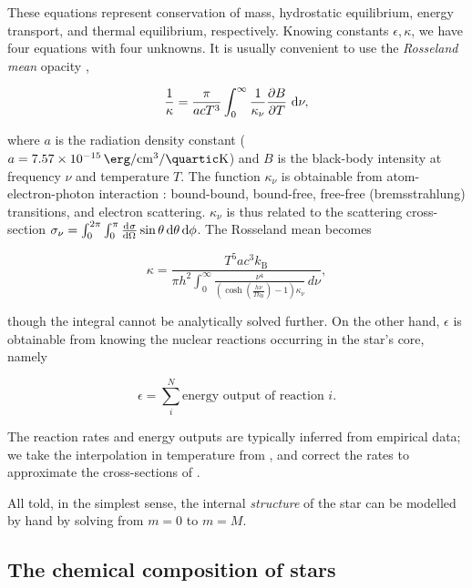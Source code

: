 These equations represent conservation of mass, hydrostatic equilibrium, energy transport, and thermal equilibrium, respectively. Knowing constants $\epsilon, \kappa$, we have four equations with four unknowns. It is usually convenient to use the \textit{Rosseland mean} opacity \citep{Rosseland:1924},

\begin{equation}
    \frac{1}{\kappa} = \frac{\pi}{acT^3}\int_0^\infty \frac{1}{\kappa_\nu}\pdv{B}{T}~\mathrm{d}\nu,
\end{equation}

where $a$ is the radiation density constant ($a=\SI{7.57e-15}{\erg\per\cubic\cm\per\quartic\kelvin}$) and $B$ is the black-body intensity at frequency $\nu$ and temperature $T$. The function $\kappa_\nu$ is obtainable from atom-electron-photon interaction \citep{Eldridge:2004a}: bound-bound, bound-free, free-free (bremsstrahlung) transitions, and electron scattering. $\kappa_\nu$ is thus related to the scattering cross-section $\sigma_\nu = \int_0^{2\pi}\int_0^\pi \dv{\sigma}{\Omega}\sin\theta\, \mathrm{d}{\theta}\, \mathrm{d}{\phi}$. The Rosseland mean becomes

\begin{equation}
    \kappa = \frac{T^5 a c^3 k_\text{B}}{\pi h^2 \int_0^\infty \frac{\nu^4}{\left(\cosh{\left(\frac{h \nu}{T k_\text{B}} \right)} - 1\right) \kappa_\nu}\, d\nu},
\end{equation}

though the integral cannot be analytically solved further. On the other hand, $\epsilon$ is obtainable from knowing the nuclear reactions occurring in the star's core, namely

\begin{equation}
    \epsilon = \sum_{i}^N \text{energy output of reaction } i.
\end{equation}

The reaction rates and energy outputs are typically inferred from empirical data; we take the interpolation in temperature from \citet{Caughlan:1988}, and correct the rates to approximate the cross-sections of \citet{Bahcall:1992, Bahcall:1995}.

All told, in the simplest sense, the internal \textit{structure} of the star can be modelled by hand by solving  from $m=0$ to $m=M$.

\subsection{The chemical composition of stars}

